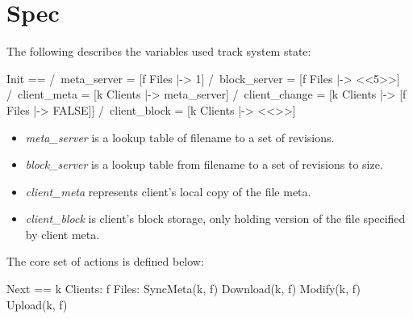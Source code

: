 \section{Spec}

The following describes the variables used track system state:\\
\begin{tla}
Init ==
    /\ meta_server = [f \in Files |-> {1}]                 
    /\ block_server = [f \in Files |-> <<5>>]
    /\ client_meta = [k \in Clients |-> meta_server]
    /\ client_change = [k \in Clients |-> [f \in Files |-> FALSE]]
    /\ client_block = [k \in Clients |-> <<>>]
\end{tla}
\begin{tlatex}
%
\end{tlatex}

\begin{itemize}
    \item \textit{meta\_server} is a lookup table of filename to a set of revisions.
    \item \textit{block\_server} is a lookup table from filename to a set of revisions to size.
    \item \textit{client\_meta} represents client's local copy of the file meta.
    \item \textit{client\_block} is client's block storage, only holding version of the file specified by client meta.
\end{itemize}



The core set of actions is defined below:\\
\begin{tla}
Next ==
    \/ \E k \in Clients: 
        \E f \in Files: 
            \/ SyncMeta(k, f)
            \/ Download(k, f)
            \/ Modify(k, f)
            \/ Upload(k, f)
\end{tla}
\begin{tlatex}
%
%
%
%
%
%
%
\end{tlatex}
\\

